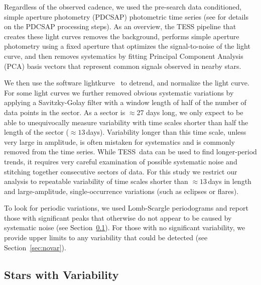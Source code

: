 \documentclass[twocolumn]{aastex631}
\newcommand{\tess}{TESS}
\newcommand{\lightkurve}{{{\fontfamily{lmtt}\selectfont lightkurve}}}
\begin{document}
Regardless of the observed cadence, we used the pre-search data conditioned, simple aperture photometry (PDCSAP) photometric time series (see \citealt{Smith2012,Stumpe2012PASP} for details on the PDCSAP processing steps). As an overview, the TESS pipeline that creates these light curves removes the background, performs simple aperture photometry using a fixed aperture that optimizes the signal-to-noise of the light curve, and then removes systematics by fitting Principal Component Analysis (PCA) basis vectors that represent common signals observed in nearby stars. 

We then use the software \lightkurve\ \citep{lightkurve} to detrend, and normalize the light curve. For some light curves we further removed obvious systematic variations by applying a Savitzky-Golay filter \citep{savgol1964AnaCh..36.1627S} with a window length of half of the number of data points in the sector. As a sector is $\approx$27 days long, we only expect to be able to unequivocally measure variability with time scales shorter than half the length of the sector ($\approx 13$\,days).  Variability longer than this time scale, unless very large in amplitude, is often mistaken for systematics and is commonly removed from the time series. While \tess\ data can be used to find longer-period trends, it requires very careful examination of possible systematic noise and stitching together consecutive sectors of data. For this study we restrict our analysis to repeatable variability of time scales shorter than $\approx 13$\,days in length and large-amplitude, single-occurrence variations (such as eclipses or flares).

To look for periodic variations, we used Lomb-Scargle periodograms \citep{Lomb1976,lightkurve} and report those with significant peaks that otherwise do not appear to be caused by systematic noise (see Section~\ref{sec:var}).  For those with no significant variability, we provide upper limits to any variability that could be detected (see Section~\ref{sec:novar}).


\subsection{Stars with Variability}
\label{sec:var}
\end{document}
